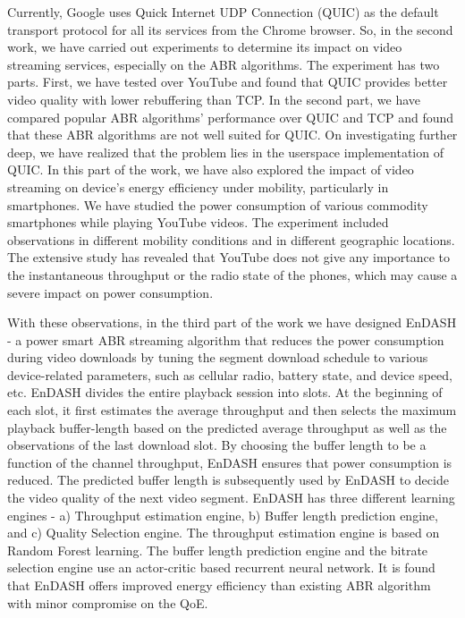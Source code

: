 {Currently, Google uses Quick Internet UDP Connection (QUIC) as the default transport protocol for all its services from the Chrome browser. So, in the second work, we have carried out experiments to determine its impact on video streaming services, especially on the ABR algorithms. The experiment has two parts. First, we have tested over YouTube and found that QUIC provides better video quality with lower rebuffering than TCP. In the second part, we have compared popular ABR algorithms' performance over QUIC and TCP and found that these ABR algorithms are not well suited for QUIC. On investigating further deep, we have realized that the problem lies in the userspace implementation of QUIC. In this part of the work, we have also explored the impact of video streaming on device's energy efficiency  under mobility, particularly in smartphones. We have studied the power consumption of various commodity smartphones while playing YouTube videos. The experiment included observations in different mobility conditions and in different geographic locations. The extensive study has revealed that YouTube does not give any importance to the instantaneous throughput or the radio state of the phones, which may cause a severe impact on power consumption.

With these observations, in the third part of the work we have designed EnDASH - a power smart ABR streaming algorithm that reduces the power consumption during video downloads by tuning the segment download schedule to various device-related parameters, such as cellular radio, battery state, and device speed, etc. EnDASH divides the entire playback session into slots. At the beginning of each slot, it first estimates the average throughput and then selects the maximum playback buffer-length based on the predicted average throughput as well as the observations of the last download slot. By choosing the buffer length to be a function of the channel throughput, EnDASH ensures that power consumption is reduced. The predicted buffer length is subsequently used by EnDASH to decide the video quality of the next video segment. EnDASH has three different learning engines - a) Throughput estimation engine, b) Buffer length prediction engine, and c) Quality Selection engine. The throughput estimation engine is based on Random Forest learning. The buffer length prediction engine and the bitrate selection engine use an actor-critic based recurrent neural network. It is found that EnDASH offers improved energy efficiency than existing ABR algorithm with minor compromise on the QoE.

}
